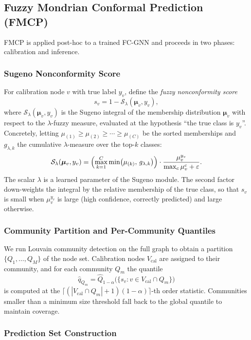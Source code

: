 \subsection{Fuzzy Mondrian Conformal Prediction (FMCP)}
\label{sec:fmcp}

FMCP is applied post-hoc to a trained FC-GNN and proceeds in two phases:
calibration and inference.

\subsubsection{Sugeno Nonconformity Score}

For calibration node $v$ with true label $y_v$, define the
\emph{fuzzy nonconformity score}
\[
  s_v = 1 - \mathcal{S}_\lambda(\bm{\mu}_v, y_v),
\]
where $\mathcal{S}_\lambda(\bm{\mu}_v, y_v)$ is the Sugeno integral of the
membership distribution $\bm{\mu}_v$ with respect to the $\lambda$-fuzzy
measure, evaluated at the hypothesis ``the true class is $y_v$''.
Concretely, letting $\mu_{(1)} \ge \mu_{(2)} \ge \cdots \ge \mu_{(C)}$
be the sorted memberships and $g_{\lambda,k}$ the cumulative $\lambda$-measure
over the top-$k$ classes:
\[
  \mathcal{S}_\lambda(\bm{\mu}_v, y_v)
  = \Bigl(\max_{k=1}^C \min\bigl(\mu_{(k)},\, g_{\lambda,k}\bigr)\Bigr)
    \cdot \frac{\mu_v^{y_v}}{\max_c \mu_v^c + \varepsilon}.
\]
The scalar $\lambda$ is a learned parameter of the Sugeno module.
The second factor down-weights the integral by the relative membership of
the true class, so that $s_v$ is small when $\mu_v^{y_v}$ is large
(high confidence, correctly predicted) and large otherwise.

\subsubsection{Community Partition and Per-Community Quantiles}

We run Louvain community detection \citep{blondel08} on the full graph to
obtain a partition $\{Q_1, \ldots, Q_M\}$ of the node set.
Calibration nodes $V_\text{cal}$ are assigned to their community, and for
each community $Q_m$ the quantile
\[
  \hat{q}_{Q_m}
  = \hat{Q}_{1-\alpha}\bigl(\{s_v : v \in V_\text{cal} \cap Q_m\}\bigr)
\]
is computed at the $\lceil(|V_\text{cal} \cap Q_m|+1)(1-\alpha)\rceil$-th
order statistic.
Communities smaller than a minimum size threshold fall back to the global
quantile to maintain coverage.

\subsubsection{Prediction Set Construction}

